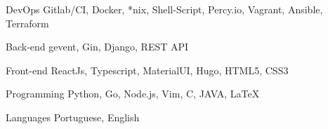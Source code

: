 

\begin{cvskills}

  \cvskill
    {DevOps} %
    {Gitlab/CI, Docker, *nix, Shell-Script, Percy.io, Vagrant, Ansible, Terraform} %

  \cvskill
    {Back-end} %
    {gevent, Gin, Django, REST API} %

  \cvskill
    {Front-end} %
    {ReactJs, Typescript, MaterialUI, Hugo, HTML5, CSS3} %

  \cvskill
    {Programming} %
    {Python, Go, Node.js, Vim, C, JAVA, LaTeX} %

  \cvskill
    {Languages} %
    {Portuguese, English} %

\end{cvskills}
